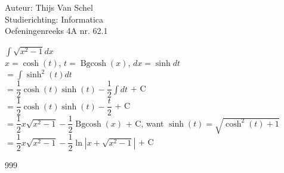 \documentclass[a4paper]{article}
\newcommand{\dint}{\displaystyle\int}
\newcommand{\Bgcosh}{\operatorname{Bgcosh}}
\begin{document}
  
\noindent \large Auteur: Thijs Van Schel \\
\noindent \large Studierichting: Informatica\\
\noindent \large Oefeningenreeks 4A nr. 62.1\\

\medskip

\normalsize

$ \dint \sqrt{x^2-1}dx$\\

$ x = \cosh(t)$, $t = \Bgcosh(x)$, $dx = \sinh dt$\\

$ = \dint \sinh^2(t)dt$\\

$ = \dfrac{1}{2} \cosh(t)\sinh(t) - \dfrac{1}{2}\dint dt$ + C\\

$ = \dfrac{1}{2} \cosh(t)\sinh(t) - \dfrac{t}{2}$ + C\\

$ = \dfrac{1}{2}x\sqrt{x^2-1} - \dfrac{1}{2}\Bgcosh(x)$ + C,
want $\sinh(t) = \sqrt{\cosh^2(t) + 1}$\\

$ = \dfrac{1}{2}x\sqrt{x^2-1} - \dfrac{1}{2} \ln|x+\sqrt{x^2-1}|$ + C\\

\begin{thebibliography}{999}
\end{thebibliography}
\end{document}

